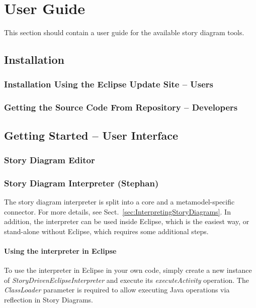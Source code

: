 \chapter{User Guide}\label{sec:UserGuide}
	
This section should contain a user guide for the available story diagram tools.


\section{Installation}


\subsection{Installation Using the Eclipse Update Site -- Users}


\subsection{Getting the Source Code From Repository -- Developers}


\section{Getting Started -- User Interface}

\subsection{Story Diagram Editor}

\subsection{Story Diagram Interpreter (Stephan)}

The story diagram interpreter is split into a core and a metamodel-specific connector. For more details, see Sect.~\ref{sec:InterpretingStoryDiagrams}. In addition, the interpreter can be used inside Eclipse, which is the easiest way, or stand-alone without Eclipse, which requires some additional steps.

\subsubsection{Using the interpreter in Eclipse}

To use the interpreter in Eclipse in your own code, simply create a new instance of \emph{StoryDrivenEclipseInterpreter} and execute its \emph{executeActivity} operation. The \emph{ClassLoader} parameter is required to allow executing Java operations via reflection in Story Diagrams.

